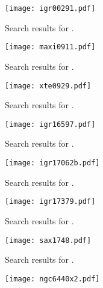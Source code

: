 \begin{subappendices}
\begin{figure*}
	\centering
	\begin{subfigure}[t]{\textwidth}
		\texttt{[image: igr00291.pdf]}
		\caption{Search results for \igra.}
		\label{fig:amxp_igra}	
	\end{subfigure}
	\par\vspace{2em} %
	\begin{subfigure}[t]{\textwidth}
		\texttt{[image: maxi0911.pdf]}
		\caption{Search results for \maxi.}
		\label{fig:amxp_maxi}	
	\end{subfigure}
	\par\vspace{2em} %
	\begin{subfigure}[t]{\textwidth}
		\texttt{[image: xte0929.pdf]}
		\caption{Search results for \xtea.}
		\label{fig:amxp_xtea}	
	\end{subfigure}
	\par\vspace{2em} %
	\begin{subfigure}[t]{\textwidth}
		\texttt{[image: igr16597.pdf]}
		\caption{Search results for \igrb.}
		\label{fig:amxp_igrb}	
	\end{subfigure}
	\par\vspace{2em} %
	\begin{subfigure}[t]{\textwidth}
		\texttt{[image: igr17062b.pdf]}
		\caption{Search results for \igrc.}
		\label{fig:amxp_igrc}	
	\end{subfigure}
\end{figure*}
%
\begin{figure*}
	\ContinuedFloat
	\centering
	\begin{subfigure}[t]{\textwidth}
		\texttt{[image: igr17379.pdf]}
		\caption{Search results for \igrd.}
		\label{fig:amxp_igrd}	
	\end{subfigure}
	\par\vspace{2em} %
	\begin{subfigure}[t]{\textwidth}
		\texttt{[image: sax1748.pdf]}
		\caption{Search results for \saxb.}
		\label{fig:amxp_saxb}	
	\end{subfigure}
	\par\vspace{2em} %
	\begin{subfigure}[t]{\textwidth}
		\texttt{[image: ngc6440x2.pdf]}

\end{subfigure}
\end{figure*}
\end{subappendices}
